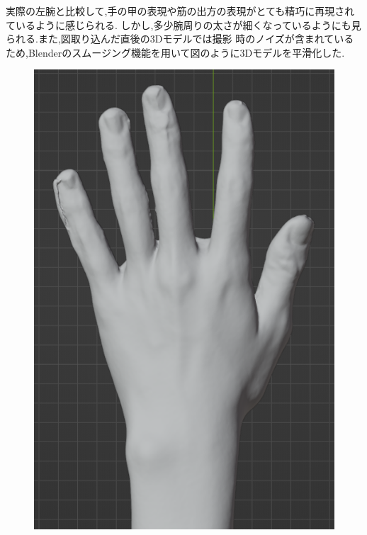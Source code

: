 \documentclass{ltjsreport}
\begin{document}
		\vspace{-10pt}

		実際の左腕と比較して,手の甲の表現や筋の出方の表現がとても精巧に再現されているように感じられる.
		しかし,多少腕周りの太さが細くなっているようにも見られる.また,図取り込んだ直後の3Dモデルでは撮影
		時のノイズが含まれているため,Blenderのスムージング機能を用いて図のように3Dモデルを平滑化した.

		\begin{figure}[H]
		\centering
		\begin{minipage}{0.3\columnwidth}
		\centering
		\includegraphics[width = \columnwidth]{../figs/SmoothingBeforRear.png}
		\label{fig:smoothingbefor}
		\end{minipage}

\end{figure}
\end{document}
